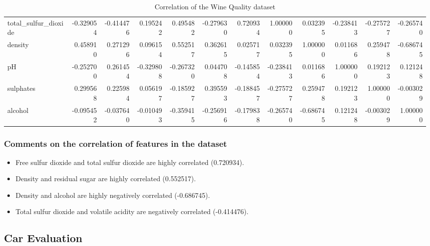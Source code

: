 \begin{table}[!h]
\begin{center}
{\begin{tabular}{lrrrrrrrrrrr}
            total\_sulfur\_dioxide &      -0.329054 &         -0.414476 &     0.195242 &        0.495482 &  -0.279630 &             0.720934 &              1.000000 &  0.032395 & -0.238413 &  -0.275727 & -0.265740 \\
            density              &       0.458910 &          0.271296 &     0.096154 &        0.552517 &   0.362615 &             0.025717 &              0.032395 &  1.000000 &  0.011686 &   0.259478 & -0.686745 \\
            pH                   &      -0.252700 &          0.261454 &    -0.329808 &       -0.267320 &   0.044708 &            -0.145854 &             -0.238413 &  0.011686 &  1.000000 &   0.192123 &  0.121248 \\
            sulphates            &       0.299568 &          0.225984 &     0.056197 &       -0.185927 &   0.395593 &            -0.188457 &             -0.275727 &  0.259478 &  0.192123 &   1.000000 & -0.003029 \\
            alcohol              &      -0.095452 &         -0.037640 &    -0.010493 &       -0.359415 &  -0.256916 &            -0.179838 &             -0.265740 & -0.686745 &  0.121248 &  -0.003029 &  1.000000 \\
            \bottomrule
        \end{tabular}
    }
    \caption{Correlation of the Wine Quality dataset}
    \end{center}
\end{table}

\newpage

\subsubsection{Comments on the correlation of features in the dataset}

\begin{itemize}
    \item Free sulfur dioxide and total sulfur dioxide are highly correlated (0.720934).
    \item Density and residual sugar are highly correlated (0.552517).
    \item Density and alcohol are highly negatively correlated (-0.686745).
    \item Total sulfur dioxide and volatile acidity are negatively correlated (-0.414476).
\end{itemize}

\subsection{Car Evaluation}

